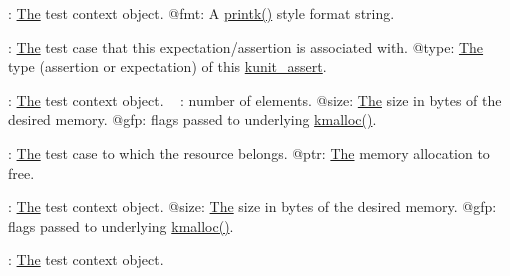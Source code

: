 \begin{DoxyRefList}
\label{test__test000021}%
%
\+: \mbox{\hyperlink{classThe}{The}} test context object. @fmt\+: A \mbox{\hyperlink{linux_2printk_8h_ac002b290a55c356b2b46a7be61a791d4}{printk()}} style format string. 
\item[Member \mbox{\hyperlink{assert_8h_a56094b11d3005451d23a43f7139360ba}{K\+U\+N\+I\+T\+\_\+\+I\+N\+I\+T\+\_\+\+F\+A\+I\+L\+\_\+\+A\+S\+S\+E\+R\+T\+\_\+\+S\+T\+R\+U\+CT}} (test, type)]\label{test__test000004}%
%
\+: \mbox{\hyperlink{classThe}{The}} test case that this expectation/assertion is associated with. @type\+: \mbox{\hyperlink{classThe}{The}} type (assertion or expectation) of this \mbox{\hyperlink{structkunit__assert}{kunit\+\_\+assert}}. 
\item[Member \mbox{\hyperlink{test_8h_af145de03f7d49a9b1a01338b3a6d732f}{kunit\+\_\+kcalloc}} (struct kunit $\ast$test, size\+\_\+t n, size\+\_\+t size, gfp\+\_\+t gfp)]\label{test__test000019}%
%
\+: \mbox{\hyperlink{classThe}{The}} test context object. ~\newline
\+: number of elements. @size\+: \mbox{\hyperlink{classThe}{The}} size in bytes of the desired memory. @gfp\+: flags passed to underlying \mbox{\hyperlink{include_2linux_2slab_8h_a1d68b78a92a928652719a969b7f75f7c}{kmalloc()}}. 
\item[Member \mbox{\hyperlink{kunit_2test_8c_ad4515865ff679360ef3838db1fd4b4bd}{kunit\+\_\+kfree}} (struct kunit $\ast$test, const void $\ast$ptr)]\label{test__test000017}%
%
\+: \mbox{\hyperlink{classThe}{The}} test case to which the resource belongs. @ptr\+: \mbox{\hyperlink{classThe}{The}} memory allocation to free.  
\item[Member \mbox{\hyperlink{test_8h_aee39a1603a64e86ce3f3e4b8e6aec5c1}{kunit\+\_\+kmalloc}} (struct kunit $\ast$test, size\+\_\+t size, gfp\+\_\+t gfp)]\label{test__test000016}%
%
\+: \mbox{\hyperlink{classThe}{The}} test context object. @size\+: \mbox{\hyperlink{classThe}{The}} size in bytes of the desired memory. @gfp\+: flags passed to underlying \mbox{\hyperlink{include_2linux_2slab_8h_a1d68b78a92a928652719a969b7f75f7c}{kmalloc()}}. 
\item[Member \mbox{\hyperlink{kunit_2test_8c_a642b7985ac055bdd8c9af509bb442901}{kunit\+\_\+kmalloc\+\_\+array}} (struct kunit $\ast$test, size\+\_\+t n, size\+\_\+t size, gfp\+\_\+t gfp)]\label{test__test000015}%
%
\+: \mbox{\hyperlink{classThe}{The}} test context object. ~\newline

\end{DoxyRefList}
